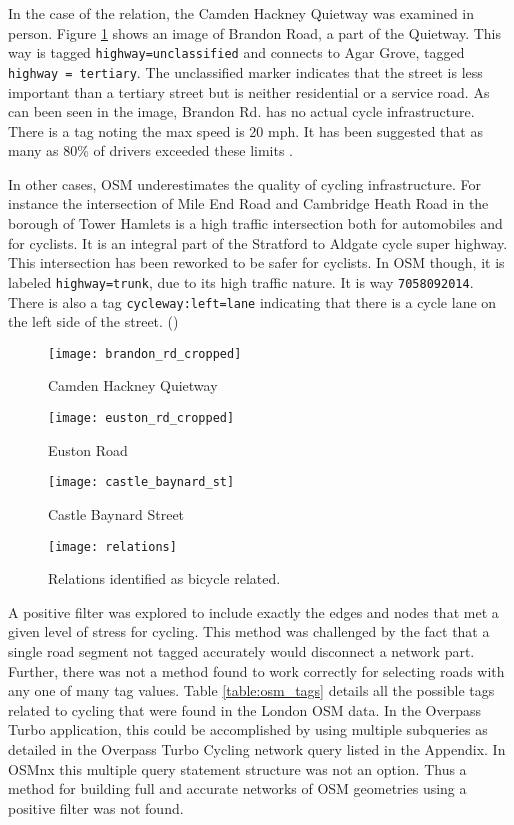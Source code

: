In the case of the relation, the Camden Hackney Quietway was examined in person. Figure \ref{fig:brandon} shows an image of Brandon Road, a part of the Quietway. This way is tagged \texttt{highway=unclassified} and connects to Agar Grove, tagged \texttt{highway = tertiary}. The unclassified marker indicates that the street is less important than a tertiary street but is neither residential or a service road. As can been seen in the image, Brandon Rd. has no actual cycle infrastructure. There is a tag noting the max speed is 20 mph. It has been suggested that as many as 80\% of drivers exceeded these limits \parencite{sun}. 

In other cases, OSM underestimates the quality of cycling infrastructure. For instance the intersection of Mile End Road and Cambridge Heath Road in the borough of Tower Hamlets is a high traffic intersection both for automobiles and for cyclists. It is an integral part of the Stratford to Aldgate cycle super highway. This intersection has been reworked to be safer for cyclists. In OSM though, it is labeled \texttt{highway=trunk}, due to its high traffic nature. It is way \texttt{7058092014}. There is also a tag \texttt{cycleway:left=lane} indicating that there is a cycle lane on the left side of the street. (\cite{osm})


\begin{figure}
\centering
\texttt{[image: brandon\_rd\_cropped]}
\caption{Camden Hackney Quietway}
\label{fig:brandon}
\end{figure}

\begin{figure}
\centering
\texttt{[image: euston\_rd\_cropped]}
\caption{Euston Road}
\label{fig:euston}
\end{figure}

\begin{figure}
  \centering
  \texttt{[image: castle\_baynard\_st]}
  \caption{Castle Baynard Street}
  \label{fig:baynard}
\end{figure}

\begin{figure}
\centering
\texttt{[image: relations]}
\caption{Relations identified as bicycle related.}
\label{fig:bicycle_relation}
\end{figure}

A positive filter was explored to include exactly the edges and nodes that met a given level of stress for cycling. This method was challenged by the fact that a single road segment not tagged accurately would disconnect a network part. Further, there was not a method found to work correctly for selecting roads with any one of many tag values.  Table \ref{table:osm_tags} details all the possible tags related to cycling that were found in the London OSM data.  In the Overpass Turbo application, this could be accomplished by using multiple subqueries as detailed in the Overpass Turbo Cycling network query listed in the Appendix. In OSMnx this multiple query statement structure was not an option. Thus a method for building full and accurate networks of OSM geometries using a positive filter was not found. 

